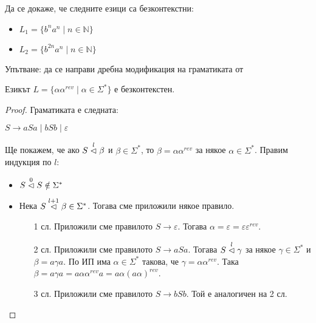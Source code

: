\begin{problem}
Да се докаже, че следните езици са безконтекстни:
\begin{itemize}
    \item $L_1 = \{ b^na^n \mid n \in \mathbb{N} \}$
    \item $L_2 = \{ b^{2n}a^n \mid n \in \mathbb{N} \}$
\end{itemize}
Упътване: да се направи дребна модификация на граматиката от 
\end{problem}

\begin{claim}
    Езикът $L = \{ \alpha \alpha^{rev} \mid \alpha \in \Sigma^* \}$ е безконтекстен.
\end{claim}

\begin{proof}
    Граматиката е следната:
    \begin{center}
        $S \rightarrow aSa \mid bSb \mid \varepsilon$
    \end{center}

    Ще покажем, че ако $S \stackrel{l}{\vartriangleleft} \beta$ и $\beta \in \Sigma^*$, то $\beta = \alpha \alpha^{rev}$ за някое $\alpha \in \Sigma^*$.
    Правим индукция по $l$:
    \begin{itemize}
        \item $S \stackrel{0}{\vartriangleleft} S \notin \Sigma^*$ \checkmark
        \item Нека $S \stackrel{l + 1}{\vartriangleleft} \beta \in \Sigma^*$.
              Тогава сме приложили някое правило.
              \begin{itemize}
                  \item[1 сл.] Приложили сме правилото $S \rightarrow \varepsilon$.
                        Тогава $\alpha = \varepsilon = \varepsilon \varepsilon^{rev}$.
                  \item[2 сл.] Приложили сме правилото $S \rightarrow aSa$.
                        Тогава $S \stackrel{l}{\vartriangleleft} \gamma$ за някое $\gamma \in \Sigma^*$ и $\beta = a \gamma a$.
                        По ИП има $\alpha \in \Sigma^*$ такова, че $\gamma = \alpha \alpha^{rev}$.
                        Така $\beta = a \gamma a = a \alpha \alpha^{rev} a = a \alpha (a \alpha)^{rev}$.
                  \item[3 сл.] Приложили сме правилото $S \rightarrow bSb$.
                        Той е аналогичен на 2 сл.
              \end{itemize}
    \end{itemize}


\end{proof}
